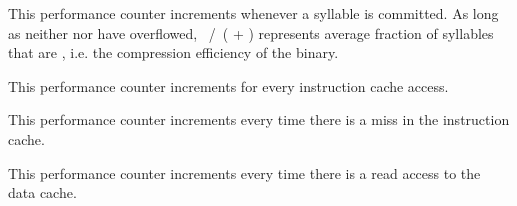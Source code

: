 \implementation{}


This performance counter increments whenever a  syllable is committed. 
As long as neither  nor  have overflowed, 
~/~( + ) represents average fraction of syllables 
that are , i.e. the compression efficiency of the binary.

\implementation{}


This performance counter increments for every instruction cache access.

\implementation{}


This performance counter increments every time there is a miss in the 
instruction cache.

\implementation{}


This performance counter increments every time there is a read access to the 
data cache.

\implementation{}


